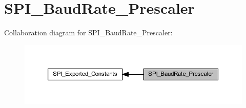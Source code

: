 \hypertarget{group___s_p_i___baud_rate___prescaler}{}\section{S\+P\+I\+\_\+\+Baud\+Rate\+\_\+\+Prescaler}
\label{group___s_p_i___baud_rate___prescaler}
Collaboration diagram for S\+P\+I\+\_\+\+Baud\+Rate\+\_\+\+Prescaler\+:
\nopagebreak
\begin{figure}[H]
\begin{center}
\leavevmode
\includegraphics[width=350pt]{group___s_p_i___baud_rate___prescaler}
\end{center}
\end{figure}
